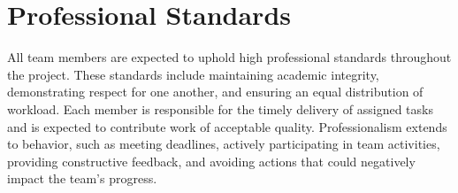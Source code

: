 \section{Professional Standards}

All team members are expected to uphold high professional standards throughout the project. These standards include maintaining academic integrity, demonstrating respect for one another, and ensuring an equal distribution of workload. Each member is responsible for the timely delivery of assigned tasks and is expected to contribute work of acceptable quality. Professionalism extends to behavior, such as meeting deadlines, actively participating in team activities, providing constructive feedback, and avoiding actions that could negatively impact the team’s progress.